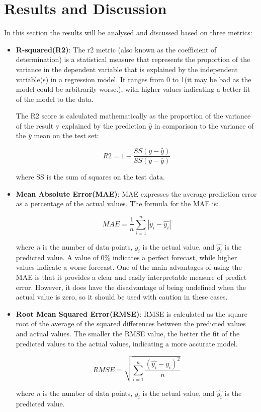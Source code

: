 \documentclass[journal]{IEEEtran} %
\begin{document}
\section{Results and Discussion}
In this section the results will be analysed and discussed based on three metrics:
\begin{itemize}
  \item \textbf{R-squared(R2)}: The r2 metric (also known as the coefficient of determination) is a statistical measure that represents the proportion of the variance in the dependent variable that is explained by the independent variable(s) in a regression model. It ranges from 0 to 1(it may be bad as the model could be arbitrarily worse.), with higher values indicating a better fit of the model to the data\cite{scikit-learnR2}. 

  The R2 score is calculated mathematically as the proportion of the variance of the result y explained by the prediction $\hat{y}$ in comparison to the variance of the $\overline{y}$ mean on the test set:
  
      \[ R2 = 1 - \frac{SS(y-\hat{y})}{SS(y-\overline{y}) }\]

    where SS is the sum of squares on the test data.
    
  \item \textbf{Mean Absolute Error(MAE)}: MAE expresses the average prediction error as a percentage of the actual values. The formula for the MAE is: 

        \[ MAE = \frac{1}{n} \sum_{i=1}^{n}{ |y_i-\hat{y_i}| }\]
  
  where \textit{n} is the number of data points, $y_i$ is the actual value, and $\hat{y_i}$ is the predicted value. A value of 0\% indicates a perfect forecast, while higher values indicate a worse forecast. One of the main advantages of using the MAE is that it provides a clear and easily interpretable measure of predict error. However, it does have the disadvantage of being undefined when the actual value is zero, so it should be used with caution in these cases\cite{Myttenaere2017}.   

    
  \item \textbf{Root Mean Squared Error(RMSE)}: RMSE is calculated as the square root of the average of the squared differences between the predicted values and actual values. The smaller the RMSE value, the better the fit of the predicted values to the actual values, indicating a more accurate model.

        \[ RMSE = \sqrt{ \sum_{i=1}^{n}{ \frac{ (\hat{y_i} - y_i)^2 }{n} }}\]

 where \textit{n} is the number of data points, $y_i$ is the actual value, and $\hat{y_i}$ is the predicted value.\\
\end{itemize}
\end{document}

